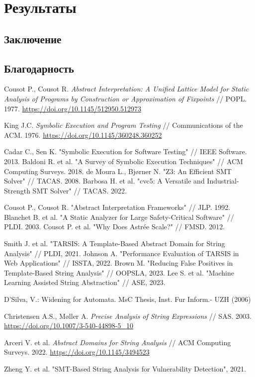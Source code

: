 \section{Результаты}

\newpage
\subsection{Заключение}


\newpage
\subsection{Благодарность}


\newpage
\begin{thebibliography}{1}

 Cousot P., Cousot R. \emph{Abstract Interpretation: A Unified Lattice Model for Static Analysis of Programs by Construction or Approximation of Fixpoints} // POPL. 1977.  
\url{https://doi.org/10.1145/512950.512973}

 King J.C. \emph{Symbolic Execution and Program Testing} // Communications of the ACM. 1976.  
\url{https://doi.org/10.1145/360248.360252}

 Cadar C., Sen K. "Symbolic Execution for Software Testing" // IEEE Software. 2013.
 Baldoni R. et al. "A Survey of Symbolic Execution Techniques" // ACM Computing Surveys. 2018.
 de Moura L., Bjørner N. "Z3: An Efficient SMT Solver" // TACAS. 2008.
 Barbosa H. et al. "cvc5: A Versatile and Industrial-Strength SMT Solver" // TACAS. 2022.

 Cousot P., Cousot R. "Abstract Interpretation Frameworks" // JLP. 1992.
 Blanchet B. et al. "A Static Analyzer for Large Safety-Critical Software" // PLDI. 2003.
 Cousot P. et al. "Why Does Astrée Scale?" // FMSD. 2012.


 Smith J. et al. "TARSIS: A Template-Based Abstract Domain for String Analysis" // PLDI, 2021.
 Johnson A. "Performance Evaluation of TARSIS in Web Applications" // ISSTA, 2022.
 Brown M. "Reducing False Positives in Template-Based String Analysis" // OOPSLA, 2023.
 Lee S. et al. "Machine Learning Assisted String Abstraction" // ASE, 2023.

  D’Silva, V.: Widening for Automata. MsC Thesis, Inst. Fur Inform.- UZH (2006)

 Christensen A.S., Møller A. \emph{Precise Analysis of String Expressions} // SAS. 2003.  
\url{https://doi.org/10.1007/3-540-44898-5_10}

 Arceri V. et al. \emph{Abstract Domains for String Analysis} // ACM Computing Surveys. 2022.  
\url{https://doi.org/10.1145/3494523}

 Zheng Y. et al. "SMT-Based String Analysis for Vulnerability Detection", 2021.


\end{thebibliography}
